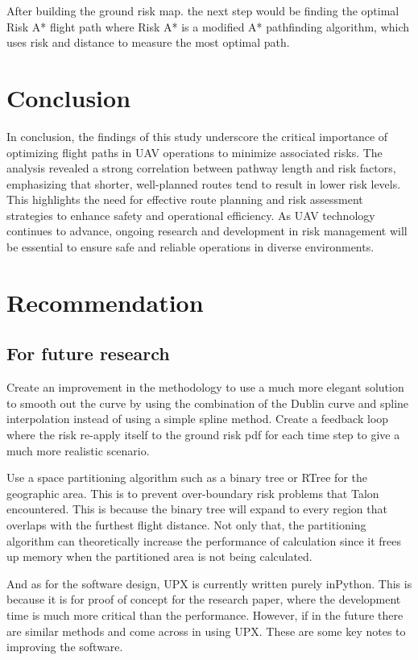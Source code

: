 \documentclass[12pt]{report}
\begin{document}
    After building the ground risk map. the next step would be finding the optimal Risk A* flight path where Risk A* is
    a modified A* pathfinding algorithm, which uses risk and distance to measure the most optimal path.

    \section{Conclusion}
        In conclusion, the findings of this study underscore the critical importance of optimizing flight paths in UAV
        operations to minimize associated risks. The analysis revealed a strong correlation between pathway length and
        risk factors, emphasizing that shorter, well-planned routes tend to result in lower risk levels. This highlights
        the need for effective route planning and risk assessment strategies to enhance safety and operational
        efficiency. As UAV technology continues to advance, ongoing research and development in risk management will be
        essential to ensure safe and reliable operations in diverse environments.


    \section{Recommendation}
        \subsection{For future research}
        Create an improvement in the methodology to use a much more elegant solution to smooth out the curve by using
        the combination of the Dublin curve and spline interpolation instead of using a simple spline method. Create a
        feedback loop where the risk re-apply itself to the ground risk pdf for each time step to give a much more
        realistic scenario.
        
        Use a space partitioning algorithm such as a binary tree or RTree for the geographic area. This is to prevent
        over-boundary risk problems that Talon encountered. This is because the binary tree will expand to every region
        that overlaps with the furthest flight distance. Not only that, the partitioning algorithm can theoretically
        increase the performance of calculation since it frees up memory when the partitioned area is not being
        calculated.

        And as for the software design, UPX is currently written purely inPython. This is because it is for proof of
        concept for the research paper, where the development time is much more critical than the performance. However,
        if in the future there are similar methods and come across in using UPX. These are some key notes to improving
        the software.
\end{document}
